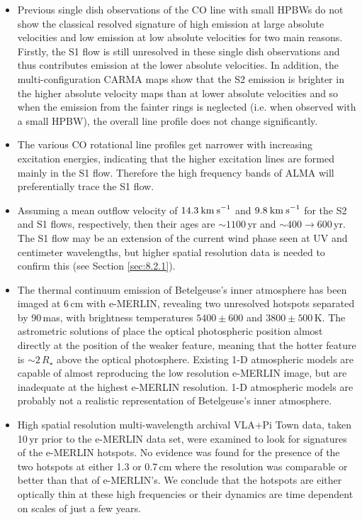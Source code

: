 \begin{itemize}
\item Previous single dish observations of the CO line with small HPBWs do not show the classical resolved signature of high emission at large absolute velocities and low emission at low absolute velocities for two main reasons. Firstly, the S1 flow is still unresolved in these single dish observations and thus contributes emission at the lower absolute velocities. In addition, the multi-configuration CARMA maps show that the S2 emission is brighter in the higher absolute velocity maps than at lower absolute velocities and so when the emission from the fainter rings is neglected (i.e. when observed with a small HPBW), the overall line profile does not change significantly.

\item The various CO rotational line profiles get narrower with increasing excitation energies, indicating that the higher excitation lines are formed mainly in the S1 flow. Therefore the high frequency bands of ALMA will preferentially trace the S1 flow. 

\item Assuming a mean outflow velocity of $14.3\>{\rm km\>s}^{-1}$ and $9.8\>{\rm km\>s}^{-1}$ for the S2 and S1 flows, respectively, then their ages are $\sim 1100$\,yr and $\sim 400 \rightarrow 600$\,yr. The S1 flow may be an extension of the current wind phase seen at UV and centimeter wavelengths, but higher spatial resolution data is needed to confirm this (see Section \ref{sec:8.2.1}).

\item The thermal continuum emission of Betelgeuse's inner atmosphere has been imaged at 6\,cm with e-MERLIN, revealing two unresolved hotspots separated by 90\,mas, with brightness temperatures $5400\pm 600$ and $3800\pm 500$\,K. The astrometric solutions of \cite{harper_2001} place the optical photospheric position almost directly at the position of the weaker feature, meaning that the hotter feature is $\sim 2\,R_{\star}$ above the optical photosphere. Existing 1-D atmospheric models are capable of almost reproducing the low resolution e-MERLIN image, but are inadequate at the highest e-MERLIN resolution. 1-D atmospheric models are probably not a realistic representation of Betelgeuse's inner atmosphere.

\item High spatial resolution multi-wavelength archival VLA+Pi Town data, taken 10\,yr prior to the e-MERLIN data set, were examined to look for signatures of the e-MERLIN hotspots. No evidence was found for the presence of the two hotspots at either 1.3 or 0.7\,cm where the resolution was comparable or better than that of e-MERLIN's. We conclude that the hotspots are either optically thin at these high frequencies or their dynamics are time dependent on scales of just a few years.


\end{itemize}
